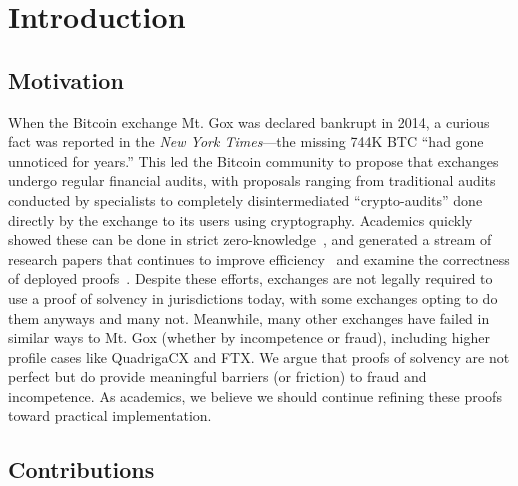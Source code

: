 
\section{Introduction}

\subsection{Motivation}

When the Bitcoin exchange Mt. Gox was declared bankrupt in 2014, a curious fact was reported in the \textit{New York Times}---the missing 744K BTC ``had gone unnoticed for years.'' This led the Bitcoin community to propose that exchanges undergo regular financial audits, with proposals ranging from traditional audits conducted by specialists to completely disintermediated ``crypto-audits'' done directly by the exchange to its users using cryptography. Academics quickly showed these can be done in strict zero-knowledge~\cite{provisions}, and generated a stream of research papers that continues to improve efficiency~\cite{bulletproofs,zeroledge,dapol,spp,notus,izpr} and examine the correctness of deployed proofs~\cite{broken}. Despite these efforts, exchanges are not legally required to use a proof of solvency in jurisdictions today, with some exchanges opting to do them anyways and many not. Meanwhile, many other exchanges have failed in similar ways to Mt. Gox (whether by incompetence or fraud), including higher profile cases like QuadrigaCX and FTX. We argue that proofs of solvency are not perfect but do provide meaningful barriers (or friction) to fraud and incompetence. As academics, we believe we should continue refining these proofs toward practical implementation.  


\subsection{Contributions}

